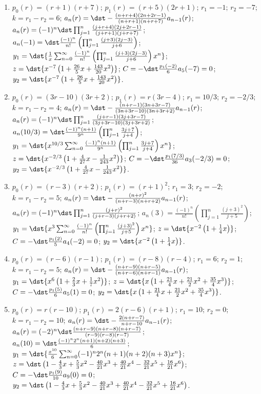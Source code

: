 \documentclass[openany]{book}
\newenvironment{sectionSolutions}{
 \begin{enumerate}[item-label={\thesection.\arabic{enumi}.}]
}{
 \end{enumerate}
}
\begin{document}
\begin{sectionSolutions}
\item
$p_0(r)=(r+1)(r+7)$;
$p_1(r)=(r+5)(2r+1)$;
$r_1=-1$; $r_2=-7$; $k=r_1-r_2=6$;
$a_n(r)=\dst -\frac{(n+r+4)(2n+2r-1)}{(n+r+1)(n+r+7)} a_{n-1}(r)$;
 $a_n(r)=(-1)^n\dst\prod_{j=1}^n
\frac{(j+r+4)(2j+2r-1)}{(j+r+1)(j+r+7)}$;
$a_n(-1)=
\dst\frac{(-1)^n}{
n!}\left(\prod_{j=1}^n\frac{(j+3)(2j-3)}{ j+6}\right)$;
$y_1=\dst{\frac{1}{ x}\sum_{n=0}^\infty\frac{(-1)^n}{
n!}\left(\prod_{j=1}^n\frac{(j+3)(2j-3)}{ j+6}\right)x^n}$;
$z=\dst{x^{-7}\left(1+\frac{26}{5}x+\frac{143}{20}x^2\right)}$;
$C=-\dst\frac{p_1(-2)}{ 6}a_5(-7)=0$;
$y_2=\dst{x^{-7}\left(1+\frac{26}{5}x+\frac{143}{20}x^2\right)}$.


\item
$p_0(r)=(3r-10)(3r+2)$;
$p_1(r)=r(3r-4)$;
$r_1=10/3$; $r_2=-2/3$; $k=r_1-r_2=4$;
$a_n(r)=\dst-\frac{(n+r-1)(3n+3r-7)}{(3n+3r-10)(3n+3r+2)}
a_{n-1}(r)$;
$a_n(r)=(-1)^n\dst\prod_{j=1}^n\frac{(j+r-1)(3j+3r-7)}{(3j+3r-10)(3j+3r+2)}$;
$a_n(10/3)=\dst\frac{(-1)^n(n+1)}{9^n}\left(\prod_{j=1}^n\frac{3j+7}{
j+4}\right)$;
$y_1=\dst{x^{10/3}\sum_{n=0}^\infty\frac{(-1)^n(n+1)}{9^n}
\left(\prod_{j=1}^n\frac{3j+7}{ j+4}\right)x^n}$;
$z=\dst{x^{-2/3}\left(1+\frac{4}{27}x-\frac{1}{243}x^2\right)}$;
$C=-\dst\frac{p_1(7/3)}{36}a_3(-2/3)=0$;
$y_2=\dst{x^{-2/3}\left(1+\frac{4}{27}x-\frac{1}{243}x^2\right)}$.



\item
$p_0(r)=(r-3)(r+2)$;
$p_1(r)=(r+1)^2$;
$r_1=3$; $r_2=-2$; $k=r_1-r_2=5$;
$a_n(r)=\dst-\frac{(n+r)^2}{(n+r-3)(n+r+2)} a_{n-1}(r)$;
 $a_n(r)=(-1)^n\dst\prod_{j=1}^n\frac{(j+r)^2}{(j+r-3)(j+r+2)}$;
$a_n(3)= \frac{(-1)^n}{ n!}\left(\prod_{j=1}^n\frac{(j+3)^2}{
j+5}\right)$;
$y_1=\dst{x^3\sum_{n=0}^\infty\frac{(-1)^n}{
n!}\left(\prod_{j=1}^n\frac{(j+3)^2}{
j+5}\right)x^n}$;
$z=\dst{x^{-2}\left(1+\frac{1}{4}x\right)}$;
$C=-\dst\frac{p_1(2)}{5}a_4(-2)=0$;
$y_2=\dst{x^{-2}\left(1+\frac{1}{4}x\right)}$.



\item
$p_0(r)=(r-6)(r-1)$;
$p_1(r)=(r-8)(r-4)$;
$r_1=6$; $r_2=1$; $k=r_1-r_2=5$;
$a_n(r)=\dst-\frac{(n+r-9)(n+r-5)}{(n+r-6)(n+r-1)}
a_{n-1}(r)$;
$y_1=\dst{x^6\left(1+\frac{2}{3}x+\frac{1}{7}x^2\right)}$;
$z=\dst{x\left(1+\frac{21}{4}x+\frac{21}{2}x^2+\frac{35}{4}x^3\right)}$;
$C=-\dst\frac{p_1(5)}{6}a_5(1)=0$;
$y_2=\dst{x\left(1+\frac{21}{4}x+\frac{21}{2}x^2+\frac{35}{4}x^3\right)}$.


\item
$p_0(r)=r(r-10)$;
$p_1(r)=2(r-6)(r+1)$;
$r_1=10$; $r_2=0$; $k=r_1-r_2=10$;
$a_n(r)=\dst -\frac{2(n+r-7)}{ n+r-10}a_{n-1}(r)$;
 $a_n(r)=(-2)^n\dst\frac{(n+r-9)(n+r-8)(n+r-7)}{(r-9)(r-8)(r-7)}$;
$a_n(10)=\dst\frac{(-1)^n2^n(n+1)(n+2)(n+3)}{6}$;
$y_1=\dst{\frac{x^{10}}{6}\sum_{n=0}^\infty(-1)^n2^n(n+1)(n+2)(n+3)x^n}$;
$z=\dst\left(1-\frac{4}{3}x+\frac{5}{3}x^2-\frac{40}{21}x^3
+\frac{40}{21}x^4-\frac{32}{21}x^5+\frac{16}{21}x^6\right)$;
$C=-\dst\frac{p_1(9)}{10}a_9(0)=0$;
$y_2=\dst\left(1-\frac{4}{3}x+\frac{5}{3}x^2-\frac{40}{21}x^3
+\frac{40}{21}x^4-\frac{32}{21}x^5+\frac{16}{21}x^6\right)$.



\end{sectionSolutions}
\end{document}
